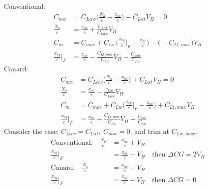 \documentclass[draft=false, titlepage]{article}
\begin{document}
\paragraph*{} Conventional:
\begin{align*}
C_{m\alpha} &= C_{L\alpha w} \Big(\frac{N_o}{c} - \frac{x_{ac}}{c}\Big) - C_{L\alpha t}V_H = 0\\
\frac{N_o}{c} &= \frac{x_{ac}}{c} + \frac{C_{L\alpha t}}{C_{L\alpha w}} V_H\\
C_m &= C_{mac} + C_{Lw} \Big(\frac{x_{cg}}{c} \Big|_F - \frac{x_{ac}}{c}\Big) - \big(-C_{Lt,max}\big) V_H\\
\frac{x_{cg}}{c} \Big|_F &= \frac{x_{ac}}{c} - \frac{C_{Lt,max}}{C_{Lw}} V_H - \frac{C_{mac}}{C_{Lw}}
\end{align*}
Canard:
\begin{align*}
C_{m\alpha} &= C_{L\alpha w}\Big( \frac{N_o}{c} - \frac{x_{ac}}{c} \Big) + C_{L\alpha t} V_H = 0\\
\frac{N_o}{c} &= \frac{x_{ac}}{c} - \frac{c_{L\alpha t}}{C_{L\alpha w}} V_H\\
C_m &= C_{mac} + C_{Lw}\Big( \frac{x_{cg}}{c} \Big|_F - \frac{x_{ac}}{c} \Big) + C_{Lt,max}V_H\\
\frac{x_{cg}}{c} \Big|_F &= \frac{x_{ac}}{c} - \frac{C_{Lt,max}}{C_{Lw}} V_H - \frac{C_{m\alpha}}{C_{Lw}}
\end{align*}
Consider the case: $C_{L\alpha w} = C_{L\alpha t},\ C_{mac}=0$, and trim at $C_{Lw,max}$.
\begin{align*}
\text{Conventional:} \quad \frac{N_o}{c} &= \frac{x_{ac}}{c} + V_H\\
\frac{x_{cg}}{c} \Big|_F &= \frac{x_{ac}}{c} -V_H \quad \text{then } \Delta CG = 2V_H\\
\text{Canard:} \quad \frac{N_o}{c} &= \frac{x_{ac}}{c} - V_H\\
\frac{x_{cg}}{c} \Big|_F &= \frac{x_{cg}}{c} - V_H \quad \text{then } \Delta CG = 0
\end{align*}

\end{document}
